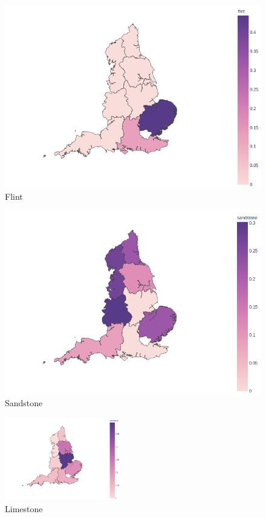 \documentclass[12pt]{article}
\begin{document}
\begin{minipage}{0.45\textwidth}
	\begin{figure}[H]
		\centering
		\includegraphics[width=\textwidth]{flint.png}
		\caption{Flint}
	\end{figure}
\end{minipage}
\begin{minipage}{0.45\textwidth}
	\begin{figure}[H]
		\centering
		\includegraphics[width=\textwidth]{sandstone.png}
		\caption{Sandstone}
	\end{figure}
\end{minipage}
\begin{figure}[H]
	\centering
	\includegraphics[width=0.45\textwidth]{limestone.png}
	\caption{Limestone}
\end{figure}
\end{document}
